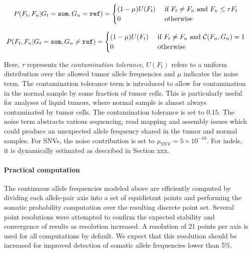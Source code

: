 \documentclass{article}
\begin{document}
\begin{equation*}
P(F_t, F_n | G_t = {\tt som}, G_n = {\tt ref})=
\begin{cases}
	(1-\mu)U(F_t) & \text{ if } F_t \neq F_n \text{ and } F_n \leq \tau F_t \\
	0 & \text{ otherwise } \\
\end{cases}
\end{equation*}

\begin{equation*}
P(F_t, F_n | G_t = {\tt som}, G_n \neq {\tt ref})=
\begin{cases}
	(1-\mu)U(F_t) & \text{ if } F_t \neq F_n \text{ and } {\cal C}(F_n, G_n) = 1\\
	0 & \text{ otherwise } \\
\end{cases}
\end{equation*}

\noindent Here, $\tau$ represents the {\em contamination tolerance}, $U(F_t)$ refers to a uniform distribution over the allowed tumor allele frequencies and $\mu$ indicates the noise term. The contamination tolerance term is introduced to allow for contamination in the normal sample by some fraction of tumor cells. This is particularly useful for analyses of liquid tumors, where normal sample is almost always contaminated by tumor cells. The contamination tolerance is set to $0.15$. The noise term abstracts various sequencing, read mapping and assembly issues which could produce an unexpected allele frequency shared in the tumor and normal samples. For SNVs, the noise contribution is set to $\mu_{\text{SNV}} = 5 \times 10^{-10}$. For indels, it is dynamically estimated as described in Section xxx.


\paragraph{Practical computation}
The continuous allele frequencies modeled above are efficiently computed by dividing each allele-pair axis into a set of equidistant points and performing the somatic probability computation over the resulting discrete point set. Several point resolutions were attempted to confirm the expected stability and convergence of results as resolution increased. A resolution of 21 points per axis is used for all computations by default. We expect that this resolution should be increased for improved detection of somatic allele frequencies lower than 5\%.
\end{document}
